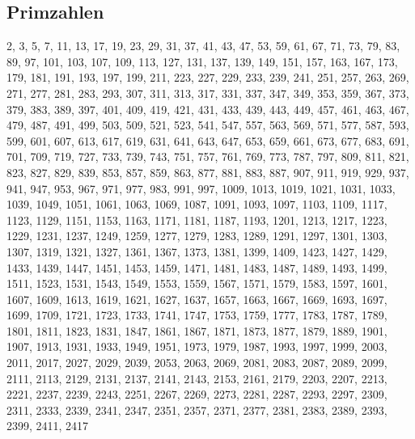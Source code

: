 \documentclass[a4paper,landscape]{article}
\begin{document}
\begin{multicols*}{4}
	\section{Primzahlen}
	2, 3, 5, 7, 11, 13, 17, 19, 23, 29, 31, 37, 41, 43, 47, 53, 59, 61, 67, 71,
	73, 79, 83, 89, 97, 101, 103, 107, 109, 113, 127, 131, 137, 139, 149, 151,
	157, 163, 167, 173, 179, 181, 191, 193, 197, 199, 211, 223, 227, 229, 233,
	239, 241, 251, 257, 263, 269, 271, 277, 281, 283, 293, 307, 311, 313, 317,
	331, 337, 347, 349, 353, 359, 367, 373, 379, 383, 389, 397, 401, 409, 419,
	421, 431, 433, 439, 443, 449, 457, 461, 463, 467, 479, 487, 491, 499, 503,
	509, 521, 523, 541, 547, 557, 563, 569, 571, 577, 587, 593, 599, 601, 607,
	613, 617, 619, 631, 641, 643, 647, 653, 659, 661, 673, 677, 683, 691, 701,
	709, 719, 727, 733, 739, 743, 751, 757, 761, 769, 773, 787, 797, 809, 811,
	821, 823, 827, 829, 839, 853, 857, 859, 863, 877, 881, 883, 887, 907, 911,
	919, 929, 937, 941, 947, 953, 967, 971, 977, 983, 991, 997, 1009, 1013,
	1019, 1021, 1031, 1033, 1039, 1049, 1051, 1061, 1063, 1069, 1087, 1091,
	1093, 1097, 1103, 1109, 1117, 1123, 1129, 1151, 1153, 1163, 1171, 1181,
	1187, 1193, 1201, 1213, 1217, 1223, 1229, 1231, 1237, 1249, 1259, 1277,
	1279, 1283, 1289, 1291, 1297, 1301, 1303, 1307, 1319, 1321, 1327, 1361,
	1367, 1373, 1381, 1399, 1409, 1423, 1427, 1429, 1433, 1439, 1447, 1451,
	1453, 1459, 1471, 1481, 1483, 1487, 1489, 1493, 1499, 1511, 1523, 1531,
	1543, 1549, 1553, 1559, 1567, 1571, 1579, 1583, 1597, 1601, 1607, 1609,
	1613, 1619, 1621, 1627, 1637, 1657, 1663, 1667, 1669, 1693, 1697, 1699,
	1709, 1721, 1723, 1733, 1741, 1747, 1753, 1759, 1777, 1783, 1787, 1789,
	1801, 1811, 1823, 1831, 1847, 1861, 1867, 1871, 1873, 1877, 1879, 1889,
	1901, 1907, 1913, 1931, 1933, 1949, 1951, 1973, 1979, 1987, 1993, 1997,
	1999, 2003, 2011, 2017, 2027, 2029, 2039, 2053, 2063, 2069, 2081, 2083,
	2087, 2089, 2099, 2111, 2113, 2129, 2131, 2137, 2141, 2143, 2153, 2161,
	2179, 2203, 2207, 2213, 2221, 2237, 2239, 2243, 2251, 2267, 2269, 2273,
	2281, 2287, 2293, 2297, 2309, 2311, 2333, 2339, 2341, 2347, 2351, 2357,
	2371, 2377, 2381, 2383, 2389, 2393, 2399, 2411, 2417
\end{multicols*}
\end{document}
